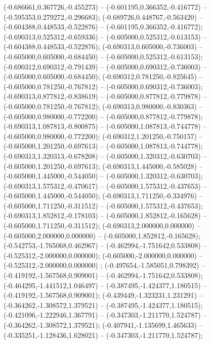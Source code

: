  (-0.686661,0.367726,-0.455273) -- (-0.601195,0.366352,-0.416772) -- (-0.595353,0.279272,-0.296683);
 (-0.689726,0.448767,-0.563420) -- (-0.604388,0.448533,-0.522876) -- (-0.601195,0.366352,-0.416772);
 (-0.690313,0.525312,-0.659336) -- (-0.605000,0.525312,-0.613153) -- (-0.604388,0.448533,-0.522876);
 (-0.690313,0.605000,-0.736003) -- (-0.605000,0.605000,-0.684450) -- (-0.605000,0.525312,-0.613153);
 (-0.690312,0.690312,-0.791439) -- (-0.605000,0.690312,-0.736003) -- (-0.605000,0.605000,-0.684450);
 (-0.690312,0.781250,-0.825645) -- (-0.605000,0.781250,-0.767812) -- (-0.605000,0.690312,-0.736003);
 (-0.690313,0.877812,-0.838619) -- (-0.605000,0.877812,-0.779878) -- (-0.605000,0.781250,-0.767812);
 (-0.690313,0.980000,-0.830363) -- (-0.605000,0.980000,-0.772200) -- (-0.605000,0.877812,-0.779878);
 (-0.690313,1.087813,-0.800875) -- (-0.605000,1.087813,-0.744778) -- (-0.605000,0.980000,-0.772200);
 (-0.690312,1.201250,-0.750157) -- (-0.605000,1.201250,-0.697613) -- (-0.605000,1.087813,-0.744778);
 (-0.690313,1.320313,-0.678208) -- (-0.605000,1.320312,-0.630703) -- (-0.605000,1.201250,-0.697613);
 (-0.690313,1.445000,-0.585028) -- (-0.605000,1.445000,-0.544050) -- (-0.605000,1.320312,-0.630703);
 (-0.690313,1.575312,-0.470617) -- (-0.605000,1.575312,-0.437653) -- (-0.605000,1.445000,-0.544050);
 (-0.690313,1.711250,-0.334976) -- (-0.605000,1.711250,-0.311512) -- (-0.605000,1.575312,-0.437653);
 (-0.690313,1.852812,-0.178103) -- (-0.605000,1.852812,-0.165628) -- (-0.605000,1.711250,-0.311512);
 (-0.690313,2.000000,0.000000) -- (-0.605000,2.000000,0.000000) -- (-0.605000,1.852812,-0.165628);
 (-0.542753,-1.765068,0.462967) -- (-0.462994,-1.751642,0.533808) -- (-0.525312,-2.000000,0.000000);
 (-0.605000,-2.000000,0.000000) -- (-0.525312,-2.000000,0.000000) ;
 (-0.497654,-1.585051,0.798392) -- (-0.419192,-1.567568,0.909001) -- (-0.462994,-1.751642,0.533808);
 (-0.464295,-1.441512,1.046497) -- (-0.387495,-1.424377,1.180515) -- (-0.419192,-1.567568,0.909001);
 (-0.439449,-1.323231,1.231291) -- (-0.364262,-1.308572,1.379521) -- (-0.387495,-1.424377,1.180515);
 (-0.421096,-1.222946,1.367791) -- (-0.347303,-1.211770,1.524787) -- (-0.364262,-1.308572,1.379521);
 (-0.407941,-1.135699,1.465633) -- (-0.335251,-1.128436,1.628021) -- (-0.347303,-1.211770,1.524787);
